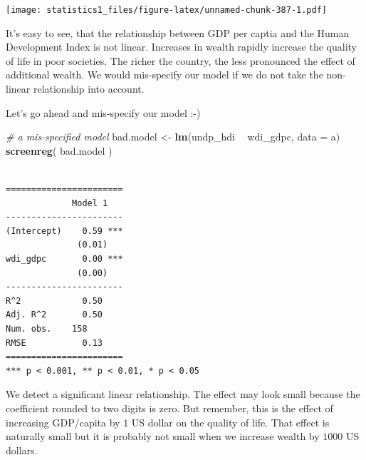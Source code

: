 \documentclass[]{article}
\newenvironment{Shaded}{\begin{snugshade}}{\end{snugshade}}
\newcommand{\KeywordTok}[1]{\textcolor[rgb]{0.13,0.29,0.53}{\textbf{#1}}}
\newcommand{\DataTypeTok}[1]{\textcolor[rgb]{0.13,0.29,0.53}{#1}}
\newcommand{\DecValTok}[1]{\textcolor[rgb]{0.00,0.00,0.81}{#1}}
\newcommand{\StringTok}[1]{\textcolor[rgb]{0.31,0.60,0.02}{#1}}
\newcommand{\CommentTok}[1]{\textcolor[rgb]{0.56,0.35,0.01}{\textit{#1}}}
\newcommand{\OtherTok}[1]{\textcolor[rgb]{0.56,0.35,0.01}{#1}}
\newcommand{\OperatorTok}[1]{\textcolor[rgb]{0.81,0.36,0.00}{\textbf{#1}}}
\newcommand{\NormalTok}[1]{#1}
\theoremstyle{definition}
\theoremstyle{definition}
\theoremstyle{definition}
\theoremstyle{remark}
\begin{document}
\begin{Shaded}
\end{Shaded}

\texttt{[image: statistics1\_files/figure-latex/unnamed-chunk-387-1.pdf]}

It's easy to see, that the relationship between GDP per captia and the
Human Development Index is not linear. Increases in wealth rapidly
increase the quality of life in poor societies. The richer the country,
the less pronounced the effect of additional wealth. We would
mis-specify our model if we do not take the non-linear relationship into
account.

Let's go ahead and mis-specify our model :-)

\begin{Shaded}
\begin{Highlighting}[]
\CommentTok{# a mis-specified model}
\NormalTok{bad.model <-}\StringTok{ }\KeywordTok{lm}\NormalTok{(undp_hdi }\OperatorTok{~}\StringTok{ }\NormalTok{wdi_gdpc, }\DataTypeTok{data =}\NormalTok{ a)}
\KeywordTok{screenreg}\NormalTok{( bad.model )}
\end{Highlighting}
\end{Shaded}

\begin{verbatim}

=======================
             Model 1   
-----------------------
(Intercept)    0.59 ***
              (0.01)   
wdi_gdpc       0.00 ***
              (0.00)   
-----------------------
R^2            0.50    
Adj. R^2       0.50    
Num. obs.    158       
RMSE           0.13    
=======================
*** p < 0.001, ** p < 0.01, * p < 0.05
\end{verbatim}

We detect a significant linear relationship. The effect may look small
because the coefficient rounded to two digits is zero. But remember,
this is the effect of increasing GDP/capita by \(1\) US dollar on the
quality of life. That effect is naturally small but it is probably not
small when we increase wealth by \(1000\) US dollars.
\end{document}
